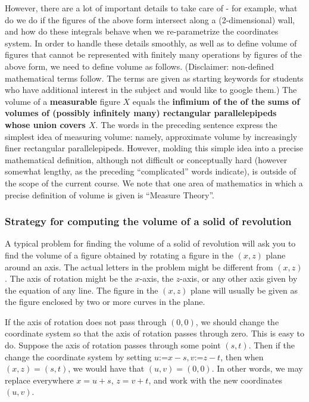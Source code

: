 \documentclass[12pt]{book}
\newcommand{\eqdef}{\textbf{:=}}
\renewcommand{\emph}{\textbf}
\begin{document}
However, there are a lot of important details to take care of - for example, what do we do if the figures of the above form intersect along a (2-dimensional) wall, and how do these integrals behave when we re-parametrize the coordinates system. In order to handle these details smoothly, as well as to define volume of figures that cannot be represented with finitely many operations by  figures of the above form,  we need to define volume as follows. (Disclaimer: non-defined mathematical terms follow. The terms are given as starting keywords for students who have additional interest in the subject and would like to google them.) The volume of a \emph{measurable} figure $X$ equals the \emph{infimium of the of the sums of volumes of (possibly infinitely many) rectangular parallelepipeds whose union covers $X$}. The words in the preceding sentence express the simplest idea of measuring volume: namely, approximate volume by increasingly finer rectangular parallelepipeds. However, molding this simple idea into a precise mathematical definition, although not difficult or conceptually hard (however somewhat lengthy, as the preceding ``complicated'' words indicate), is outside of the scope of the current course. We note that one area of mathematics in which a precise definition of volume is given is ``Measure Theory''.
\subsubsection{Strategy for computing the volume of a solid of revolution}

A typical problem for finding the volume of a solid of revolution will ask you to find the volume of a figure obtained by rotating a figure in the $(x,z)$ plane around an axis. The actual letters in the problem might be different from $(x,z)$. The axis of rotation might be the $x$-axis, the $z$-axis, or any other axis given by the equation of any line. The figure in the $(x,z)$ plane will usually be given as the figure enclosed by two or more curves in the plane.

If the axis of rotation does not pass through $(0,0)$, we should change the coordinate system so that the axis of rotation passes through zero. This is easy to do. Suppose the axis of rotation passes through some point $(s,t)$. Then if the change the coordinate system by setting $u\eqdef x-s, v\eqdef z-t$, then when $(x,z)=(s,t)$, we would have that $(u,v)=(0,0)$. In other words, we may replace everywhere $x=u+s$, $z=v+t$, and work with the new coordinates $(u,v)$.
\end{document}
